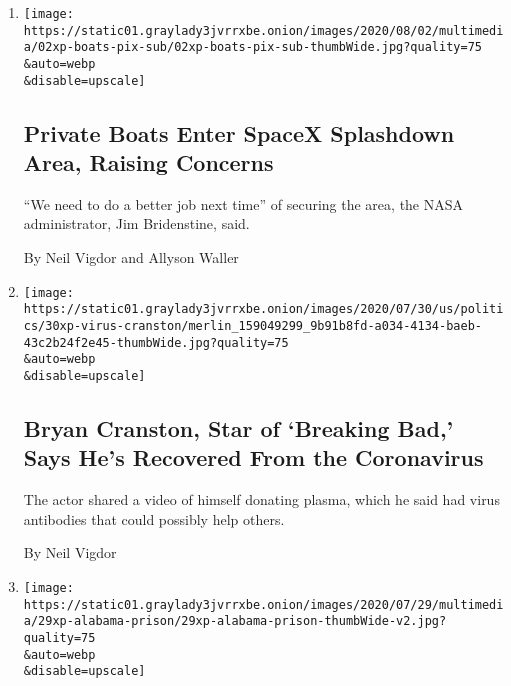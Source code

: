 \begin{enumerate}
\def\labelenumi{\arabic{enumi}.}
\item
  \href{/2020/08/02/us/flag-boat-SpaceX.html}{}

  \texttt{[image: https://static01.graylady3jvrrxbe.onion/images/2020/08/02/multimedia/02xp-boats-pix-sub/02xp-boats-pix-sub-thumbWide.jpg?quality=75\\\&auto=webp\\\&disable=upscale]}

  \hypertarget{private-boats-enter-spacex-splashdown-area-raising-concerns}{%
  \subsection{Private Boats Enter SpaceX Splashdown Area, Raising
  Concerns}\label{private-boats-enter-spacex-splashdown-area-raising-concerns}}

  ``We need to do a better job next time'' of securing the area, the
  NASA administrator, Jim Bridenstine, said.

  By Neil Vigdor and Allyson Waller
\item
  \href{/2020/07/31/arts/television/bryan-cranston-coronavirus-plasma.html}{}

  \texttt{[image: https://static01.graylady3jvrrxbe.onion/images/2020/07/30/us/politics/30xp-virus-cranston/merlin\_159049299\_9b91b8fd-a034-4134-baeb-43c2b24f2e45-thumbWide.jpg?quality=75\\\&auto=webp\\\&disable=upscale]}

  \hypertarget{bryan-cranston-star-of-breaking-bad-says-hes-recovered-from-the-coronavirus}{%
  \subsection{Bryan Cranston, Star of `Breaking Bad,' Says He's
  Recovered From the
  Coronavirus}\label{bryan-cranston-star-of-breaking-bad-says-hes-recovered-from-the-coronavirus}}

  The actor shared a video of himself donating plasma, which he said had
  virus antibodies that could possibly help others.

  By Neil Vigdor
\item
  \href{/2020/07/30/us/alabama-correction-officers-charged.html}{}

  \texttt{[image: https://static01.graylady3jvrrxbe.onion/images/2020/07/29/multimedia/29xp-alabama-prison/29xp-alabama-prison-thumbWide-v2.jpg?quality=75\\\&auto=webp\\\&disable=upscale]}

  \hypertarget{4-guards-charged-in-inmates-beating-at-alabama-prison}{%
}
\end{enumerate}
